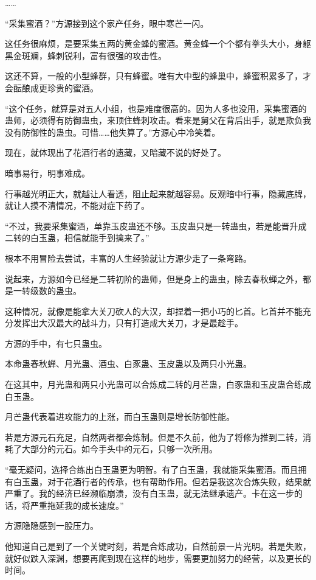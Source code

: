 \begin{this_body}
……

“采集蜜酒？”方源接到这个家产任务，眼中寒芒一闪。

这任务很麻烦，是要采集五两的黄金蜂的蜜酒。黄金蜂一个个都有拳头大小，身躯黑金斑斓，蜂刺锐利，富有很强的攻击性。

这还不算，一般的小型蜂群，只有蜂蜜。唯有大中型的蜂巢中，蜂蜜积累多了，才会酝酿成更珍贵的蜜酒。

“这个任务，就算是对五人小组，也是难度很高的。因为人多也没用，采集蜜酒的蛊师，必须得有防御蛊虫，来顶住蜂刺攻击。看来是舅父在背后出手，就是欺负我没有防御性的蛊虫。可惜……他失算了。”方源心中冷笑着。

现在，就体现出了花酒行者的遗藏，又暗藏不说的好处了。

暗事易行，明事难成。

行事越光明正大，就越让人看透，阻止起来就越容易。反观暗中行事，隐藏底牌，就让人摸不清情况，不能对症下药了。

“不过，我要采集蜜酒，单靠玉皮蛊还不够。玉皮蛊只是一转蛊虫，若是能晋升成二转的白玉蛊，相信就能手到擒来了。”

根本不用冒险去尝试，丰富的人生经验就让方源少走了一条弯路。

说起来，方源如今已经是二转初阶的蛊师，但是身上的蛊虫，除去春秋蝉之外，都是一转级数的蛊虫。

这种情况，就像是能拿大关刀砍人的大汉，却捏着一把小巧的匕首。匕首并不能充分发挥出大汉最大的战斗力，只有打造成大关刀，才是最趁手。

方源的手中，有七只蛊虫。

本命蛊春秋蝉、月光蛊、酒虫、白豕蛊、玉皮蛊以及两只小光蛊。

在这其中，月光蛊和两只小光蛊可以合炼成二转的月芒蛊，白豕蛊和玉皮蛊合练成白玉蛊。

月芒蛊代表着进攻能力的上涨，而白玉蛊则是增长防御性能。

若是方源元石充足，自然两者都会炼制。但是不久前，他为了将修为推到二转，消耗了大部分的元石。如今手头中的元石，只够一次所用。

“毫无疑问，选择合练出白玉蛊更为明智。有了白玉蛊，我就能采集蜜酒。而且拥有白玉蛊，对于花酒行者的传承，也有帮助作用。但若是我这次合炼失败，结果就严重了。我的经济已经濒临崩溃，没有白玉蛊，就无法继承遗产。卡在这一步的话，将严重拖延我的成长速度。”

方源隐隐感到一股压力。

他知道自己是到了一个关键时刻，若是合炼成功，自然前景一片光明。若是失败，就好似跌入深渊，想要再爬到现在这样的地步，需要更加努力的经营，以及更长的时间。


\end{this_body}
